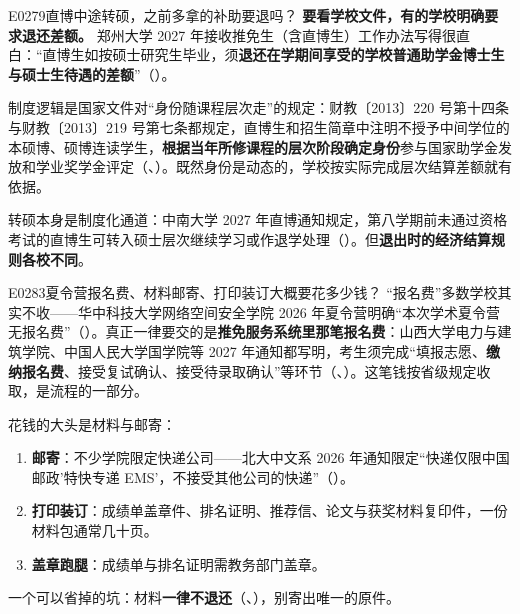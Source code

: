 \begin{qa}{E0279}{直博中途转硕，之前多拿的补助要退吗？}
\textbf{要看学校文件，有的学校明确要求退还差额。} 郑州大学 2027 年接收推免生（含直博生）工作办法写得很直白：“直博生如按硕士研究生毕业，须\textbf{退还在学期间享受的学校普通助学金博士生与硕士生待遇的差额}”（）。

制度逻辑是国家文件对“身份随课程层次走”的规定：财教〔2013〕220 号第十四条与财教〔2013〕219 号第七条都规定，直博生和招生简章中注明不授予中间学位的本硕博、硕博连读学生，\textbf{根据当年所修课程的层次阶段确定身份}参与国家助学金发放和学业奖学金评定（、）。既然身份是动态的，学校按实际完成层次结算差额就有依据。

转硕本身是制度化通道：中南大学 2027 年直博通知规定，第八学期前未通过资格考试的直博生可转入硕士层次继续学习或作退学处理（）。但\textbf{退出时的经济结算规则各校不同}。
\end{qa}

\begin{qa}{E0283}{夏令营报名费、材料邮寄、打印装订大概要花多少钱？}
“报名费”多数学校其实不收——华中科技大学网络空间安全学院 2026 年夏令营明确“本次学术夏令营无报名费”（）。真正一律要交的是\textbf{推免服务系统里那笔报名费}：山西大学电力与建筑学院、中国人民大学国学院等 2027 年通知都写明，考生须完成“填报志愿、\textbf{缴纳报名费}、接受复试确认、接受待录取确认”等环节（、）。这笔钱按省级规定收取，是流程的一部分。

花钱的大头是材料与邮寄：

\begin{enumerate}
  \item \textbf{邮寄}：不少学院限定快递公司——北大中文系 2026 年通知限定“快递仅限中国邮政'特快专递 EMS'，不接受其他公司的快递”（）。
  \item \textbf{打印装订}：成绩单盖章件、排名证明、推荐信、论文与获奖材料复印件，一份材料包通常几十页。
  \item \textbf{盖章跑腿}：成绩单与排名证明需教务部门盖章。
\end{enumerate}

一个可以省掉的坑：材料\textbf{一律不退还}（、），别寄出唯一的原件。
\end{qa}

